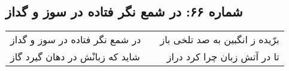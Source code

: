 \begin{center}
\section*{شماره ۶۶: در شمع نگر فتاده در سوز و گداز}
\label{sec:066}
\begin{longtable}{l p{0.5cm} r}
در شمع نگر فتاده در سوز و گداز
&&
برّیده ز انگبین به صد تلخی باز
\\
شاید که زبانْش در دهان گیرد گاز
&&
تا در آتش زبان چرا کرد دراز
\\
\end{longtable}
\end{center}
